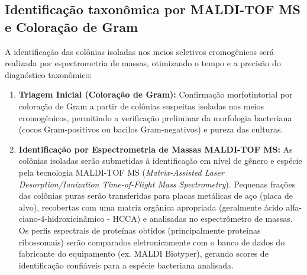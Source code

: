 \documentclass[12pt,a4paper]{article}
\begin{document}
\subsection{Identificação taxonômica por MALDI-TOF MS e Coloração de Gram}
A identificação das colônias isoladas nos meios seletivos cromogênicos será realizada por espectrometria de massas, otimizando o tempo e a precisão do diagnóstico taxonômico:
\begin{enumerate}
    \item \textbf{Triagem Inicial (Coloração de Gram):} Confirmação morfotintorial por coloração de Gram a partir de colônias suspeitas isoladas nos meios cromogênicos, permitindo a verificação preliminar da morfologia bacteriana (cocos Gram-positivos ou bacilos Gram-negativos) e pureza das culturas.
    \item \textbf{Identificação por Espectrometria de Massas MALDI-TOF MS:} As colônias isoladas serão submetidas à identificação em nível de gênero e espécie pela tecnologia MALDI-TOF MS (\textit{Matrix-Assisted Laser Desorption/Ionization Time-of-Flight Mass Spectrometry}). Pequenas frações das colônias puras serão transferidas para placas metálicas de aço (placa de alvo), recobertas com uma matriz orgânica apropriada (geralmente ácido alfa-ciano-4-hidroxicinâmico - HCCA) e analisadas no espectrômetro de massas. Os perfis espectrais de proteínas obtidos (principalmente proteínas ribossomais) serão comparados eletronicamente com o banco de dados do fabricante do equipamento (ex. MALDI Biotyper), gerando scores de identificação confiáveis para a espécie bacteriana analisada.
\end{enumerate}
\end{document}
